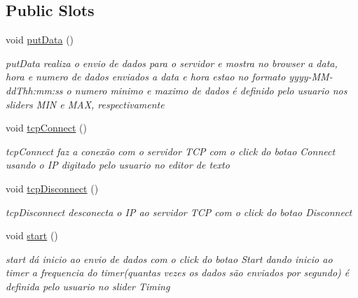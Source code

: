\subsection*{Public Slots}
\begin{DoxyCompactItemize}
\item 
\mbox{\label{class_main_window_afdfeb13ec363b0eb8ecacaf0aa13b605}} 
void \hyperlink{class_main_window_afdfeb13ec363b0eb8ecacaf0aa13b605}{put\+Data} ()
\begin{DoxyCompactList}\small\item\em put\+Data realiza o envio de dados para o servidor e mostra no browser a data, hora e numero de dados enviados a data e hora estao no formato yyyy-\/\+M\+M-\/dd\+Thh\+:mm\+:ss o numero minimo e maximo de dados é definido pelo usuario nos sliders M\+IN e M\+AX, respectivamente \end{DoxyCompactList}\item 
\mbox{\label{class_main_window_ac5b669957c442b6eb68573dacfce33e1}} 
void \hyperlink{class_main_window_ac5b669957c442b6eb68573dacfce33e1}{tcp\+Connect} ()
\begin{DoxyCompactList}\small\item\em tcp\+Connect faz a conexão com o servidor T\+CP com o click do botao Connect usando o IP digitado pelo usuario no editor de texto \end{DoxyCompactList}\item 
\mbox{\label{class_main_window_a4d22c4c7afc7ba0a2fa4c70515c85dda}} 
void \hyperlink{class_main_window_a4d22c4c7afc7ba0a2fa4c70515c85dda}{tcp\+Disconnect} ()
\begin{DoxyCompactList}\small\item\em tcp\+Disconnect desconecta o IP ao servidor T\+CP com o click do botao Disconnect \end{DoxyCompactList}\item 
\mbox{\label{class_main_window_a5edcbc314e782645cdf4db101eeb247d}} 
void \hyperlink{class_main_window_a5edcbc314e782645cdf4db101eeb247d}{start} ()
\begin{DoxyCompactList}\small\item\em start dá inicio ao envio de dados com o click do botao Start dando inicio ao timer a frequencia do timer(quantas vezes os dados são enviados por segundo) é definida pelo usuario no slider Timing \end{DoxyCompactList}\item 

\end{DoxyCompactItemize}
